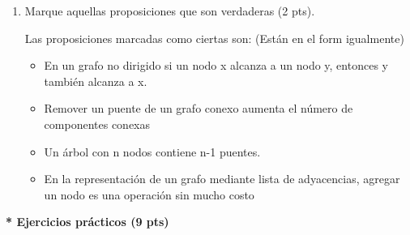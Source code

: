 \documentclass[a4paper,12pt]{article}
\begin{document}
\begin{enumerate}
\item Marque aquellas proposiciones que son verdaderas (2 pts).

\begin{flushleft}
Las proposiciones marcadas como ciertas son: (Están en el form igualmente)
\begin{itemize}
\item En un grafo no dirigido si un nodo x alcanza a un nodo y, entonces y también alcanza a x.

\item Remover un puente de un grafo conexo aumenta el número de componentes conexas

\item Un árbol con n nodos contiene n-1 puentes.

\item En la representación de un grafo mediante lista de adyacencias, agregar un nodo es una operación sin mucho costo
\end{itemize}

\end{flushleft}

\end{enumerate}

\textbf{ * Ejercicios prácticos (9 pts)}
\end{document}
